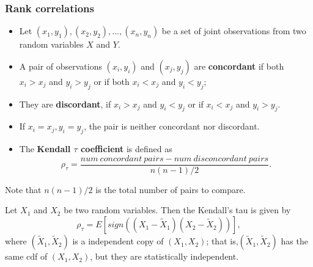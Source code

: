 \begin{refsection}
\subsubsection{Rank correlations}

\begin{definition}\label{ch:statistical-models:th:KendallTauForObservations}\hfill
\begin{itemize}
	\item Let $(x_1,y_1),(x_2,y_2),...,(x_n,y_n)$ be a set of joint observations from two random variables $X$ and $Y$.
	\item A pair of observations $(x_i,y_i)$ and $(x_j,y_j)$ are \textbf{concordant} if both $x_i > x_j$ and $y_i>y_j$ or if both $x_i < x_j$ and $y_i<y_j$; 
	\item They are \textbf{discordant}, if $x_i > x_j$ and $y_i<y_j$ or if $x_i < x_j$ and $y_i>y_j$. 
	\item If $x_i=x_j, y_i=y_j$, the pair is neither concordant nor discordant.
	\item The \textbf{Kendall $\tau$ coefficient} is defined as
	$$\rho_\tau = \frac{num ~concordant~pairs - num ~disconcordant~pairs}{n(n-1)/2}.$$
\end{itemize}	
Note that $n(n-1)/2$ is the total number of pairs to compare.
\end{definition}


\begin{definition}\cite[207]{mcneil2015quantitative}
Let $X_1$ and $X_2$ be two random variables. Then the Kendall's tau is given by
$$\rho_\tau = E[sign((X_1-\tilde{X}_1)(X_2 - \tilde{X}_2))],$$
where $(\tilde{X}_1,\tilde{X}_2)$ is a independent copy of $(X_1,X_2)$; that is,$(\tilde{X}_1,\tilde{X}_2)$ has the same cdf of $(X_1,X_2)$, but they are statistically independent. 	
\end{definition}





\end{refsection}
